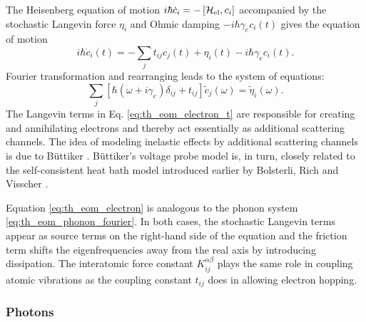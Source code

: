 The Heisenberg equation of motion $i\hbar \dot{c}_i = - \left[\mathcal{H}_{\textrm{el}},c_i \right]$ \cite{ballentine} accompanied by the stochastic Langevin force $\eta_i$ and Ohmic damping $-i\hbar \gamma_e c_i(t)$ \cite{dhar03} gives the equation of motion
\begin{equation}
 i \hbar \dot{c}_i(t) = - \sum_{j} t_{ij} c_j(t) + \eta_i(t) - i\hbar \gamma_e c_i(t). \label{eq:th_eom_electron_t}
\end{equation}
Fourier transformation and rearranging leads to the system of equations:
\begin{equation}
 \sum_{j} \left[\hbar (\omega+i\gamma_e) \delta_{ij} + t_{ij} \right] \tilde c_j(\omega) = \tilde \eta_i(\omega) . \label{eq:th_eom_electron}
\end{equation}
The Langevin terms in Eq. \eqref{eq:th_eom_electron_t} are responsible for creating and annihilating electrons and thereby act essentially as additional scattering channels. The idea of modeling inelastic effects by additional scattering channels is due to B\"uttiker \cite{buttiker86}. B\"uttiker's voltage probe model is, in turn, closely related to the self-consistent heat bath model introduced earlier by Bolsterli, Rich and Visscher \cite{bolsterli70}.

Equation \eqref{eq:th_eom_electron} is analogous to the phonon system \eqref{eq:th_eom_phonon_fourier}. In both cases, the stochastic Langevin terms appear as source terms on the right-hand side of the equation and the friction term shifts the eigenfrequencies away from the real axis by introducing dissipation. The interatomic force constant $K_{ij}^{\alpha\beta}$ plays the same role in coupling atomic vibrations as the coupling constant $t_{ij}$ does in allowing electron hopping. 




\subsubsection{Photons}

